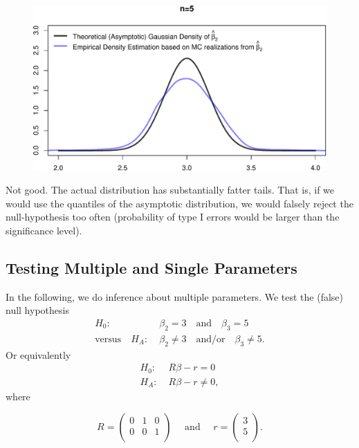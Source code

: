\documentclass[
  letterpaper,
  DIV=11,
  numbers=noendperiod]{scrreprt}
\theoremstyle{definition}
\theoremstyle{plain}
\theoremstyle{plain}
\theoremstyle{remark}
\begin{document}
{\begin{figure}[H]
{\centering \includegraphics{./06-Asymptotics_files/figure-pdf/unnamed-chunk-8-1.pdf}

}

\end{figure}

Not good. The actual distribution has substantially fatter tails. That
is, if we would use the quantiles of the asymptotic distribution, we
would falsely reject the null-hypothesis too often (probability of type
I errors would be larger than the significance level).

\hypertarget{testing-multiple-and-single-parameters}{%
\subsection{Testing Multiple and Single
Parameters}\label{testing-multiple-and-single-parameters}}

In the following, we do inference about multiple parameters. We test the
(false) null hypothesis \begin{align*}
H_0:\;&\beta_2=3\quad\text{and}\quad\beta_3=5\\
\text{versus}\quad H_A:\;&\beta_2\neq 3\quad\text{and/or}\quad\beta_3\neq 5.
\end{align*} Or equivalently \begin{align*}
H_0:\;&R\beta -r = 0 \\
H_A:\;&R\beta -r \neq 0,
\end{align*} where

\[
R=\left(
\begin{matrix}
0&1&0\\
0&0&1\\
\end{matrix}\right)\quad\text{ and }\quad 
r=\left(\begin{matrix}3\\5\\\end{matrix}\right).
\]

}
\end{document}
